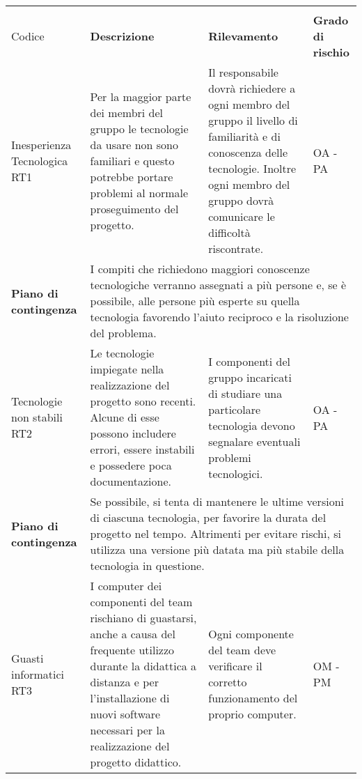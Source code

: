\begin{center}
		\begin{longtable}{|p{}|p{}|p{}|p{}|}
			\hline
			\rowcolor{lighter-grayer}
			\centering\textbf{Nome \\ Codice} & \centering\textbf{Descrizione} & \centering\textbf{Rilevamento} & \textbf{Grado di rischio} \\
			\hline
			\endfirsthead
		
		\hline
		\centering Inesperienza Tecnologica RT1& Per la maggior parte dei membri del gruppo le tecnologie da usare non sono familiari e questo potrebbe portare problemi al normale proseguimento del progetto.  & Il responsabile dovrà richiedere a ogni membro del gruppo il livello di familiarità e di conoscenza delle tecnologie. Inoltre ogni membro del gruppo dovrà comunicare le difficoltà riscontrate. &  OA - PA \\
		\hline
		\centering \textbf{Piano di contingenza} & \multicolumn{3}{p{0.84\textwidth}}{I compiti che richiedono maggiori conoscenze tecnologiche verranno assegnati a più persone e, se è possibile, alle persone più esperte su quella tecnologia favorendo l'aiuto reciproco e la risoluzione del problema.} \\
		\hline
		\centering Tecnologie non stabili RT2& Le tecnologie impiegate nella realizzazione del progetto sono recenti. Alcune di esse possono includere errori, essere instabili e possedere poca documentazione.  & I componenti del gruppo incaricati di studiare una particolare tecnologia devono segnalare eventuali problemi tecnologici. &  OA - PA \\
		\hline
		\centering \textbf{Piano di contingenza} & \multicolumn{3}{p{0.84\textwidth}}{Se possibile, si tenta di mantenere le ultime versioni di ciascuna tecnologia, per favorire la durata del progetto nel tempo. Altrimenti per evitare rischi, si utilizza una versione più datata ma più stabile della tecnologia in questione.} \\
		\hline
		\centering Guasti informatici RT3& I computer dei componenti del team rischiano di guastarsi, anche a causa del frequente utilizzo durante la didattica a distanza e per l’installazione di nuovi software necessari per la realizzazione del progetto didattico.  & Ogni componente del team deve verificare il corretto funzionamento del proprio computer. &  OM - PM \\

\end{longtable}
\end{center}
